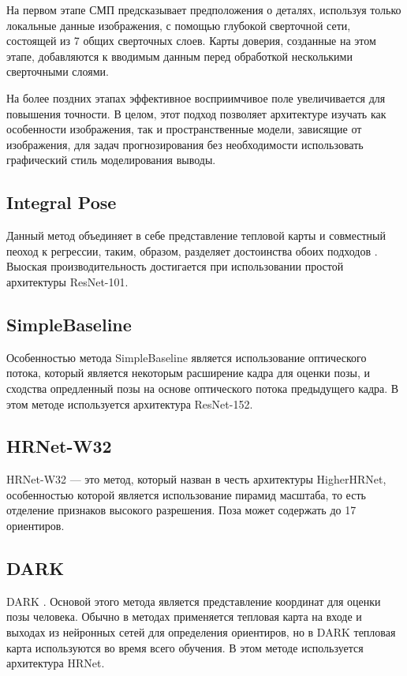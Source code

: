 На первом этапе СМП предсказывает предположения о деталях, используя только локальные данные изображения, с помощью глубокой сверточной сети, состоящей из 7 общих сверточных слоев. Карты доверия, созданные на этом этапе, добавляются к вводимым данным перед обработкой несколькими сверточными слоями.

На более поздних этапах эффективное восприимчивое поле увеличивается для повышения точности. 
В целом, этот подход позволяет архитектуре изучать как особенности изображения, так и пространственные модели, зависящие от изображения, для задач прогнозирования без необходимости использовать графический стиль моделирования выводы.

\subsection{Integral Pose}

Данный метод объединяет в себе представление тепловой карты и совместный пеоход к регрессии, таким, образом, разделяет достоинства обоих подходов \cite{sun2017integral}. Выоская производительность достигается при использовании простой архитектуры ResNet-101.

\subsection{SimpleBaseline}

Особенностью метода SimpleBaseline \cite{xiao2018simple} является использование оптического потока, который является некоторым расширение кадра для оценки позы, и сходства опредленный позы на основе оптического потока предыдущего кадра. В этом методе используется архитектура ResNet-152.

\subsection{HRNet-W32}

HRNet-W32 \cite{sun2019deep} --- это метод, который назван в честь архитектуры HigherHRNet, особенностью которой является использование пирамид масштаба, то есть отделение признаков высокого разрешения. Поза может содержать до 17 ориентиров.

\subsection{DARK}

DARK \cite{Zhang_2020_CVPR}. Основой этого метода является представление координат для оценки позы человека. Обычно в методах применяется тепловая карта на входе и выходах из нейронных сетей для определения ориентиров, но в DARK тепловая карта используются во время всего обучения. В этом методе используется архитектура HRNet.

